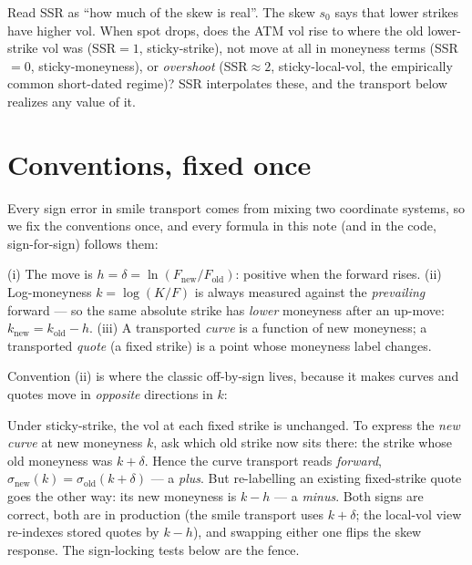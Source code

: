 \documentclass[11pt]{article}
\begin{document}
\begin{heuristic}
Read SSR as ``how much of the skew is real''. The skew $s_0$ says that lower
strikes have higher vol. When spot drops, does the ATM vol rise to where the old
lower-strike vol was (SSR$=1$, sticky-strike), not move at all in moneyness terms
(SSR$=0$, sticky-moneyness), or \emph{overshoot} (SSR$\approx2$, sticky-local-vol,
the empirically common short-dated regime)? SSR interpolates these, and the
transport below realizes any value of it.
\end{heuristic}

\section{Conventions, fixed once}
\label{sec:conventions}

Every sign error in smile transport comes from mixing two coordinate systems,
so we fix the conventions once, and every formula in this note (and in the
code, sign-for-sign) follows them:

\begin{assumption}
\label{ass:signs}
(i) The move is $h=\delta=\ln(F_{\text{new}}/F_{\text{old}})$: positive when
the forward rises. (ii) Log-moneyness $k=\log(K/F)$ is always measured
against the \emph{prevailing} forward --- so the same absolute strike has
\emph{lower} moneyness after an up-move: $k_{\text{new}}=k_{\text{old}}-h$.
(iii) A transported \emph{curve} is a function of new moneyness; a
transported \emph{quote} (a fixed strike) is a point whose moneyness label
changes.
\end{assumption}

Convention (ii) is where the classic off-by-sign lives, because it makes
curves and quotes move in \emph{opposite} directions in $k$:

\begin{caution}
Under sticky-strike, the vol at each fixed strike is unchanged. To express
the \emph{new curve} at new moneyness $k$, ask which old strike now sits
there: the strike whose old moneyness was $k+\delta$. Hence the curve
transport reads \emph{forward}, $\sigma_{\text{new}}(k)=
\sigma_{\text{old}}(k+\delta)$ --- a \emph{plus}. But re-labelling an
existing fixed-strike quote goes the other way: its new moneyness is
$k-h$ --- a \emph{minus}. Both signs are correct, both are in production
(the smile transport uses $k+\delta$; the local-vol view re-indexes stored
quotes by $k-h$), and swapping either one flips the skew response. The
sign-locking tests below are the fence.
\end{caution}
\end{document}

